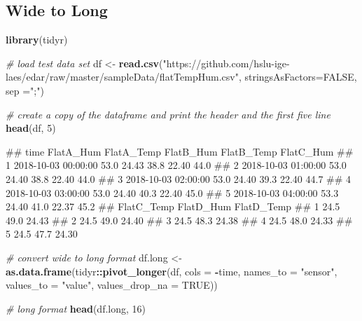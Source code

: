 \documentclass[
  a4paperpaper,
]{book}
\newenvironment{Shaded}{\begin{snugshade}}{\end{snugshade}}
\newcommand{\CommentTok}[1]{\textcolor[rgb]{0.56,0.35,0.01}{\textit{#1}}}
\newcommand{\DataTypeTok}[1]{\textcolor[rgb]{0.13,0.29,0.53}{#1}}
\newcommand{\DecValTok}[1]{\textcolor[rgb]{0.00,0.00,0.81}{#1}}
\newcommand{\KeywordTok}[1]{\textcolor[rgb]{0.13,0.29,0.53}{\textbf{#1}}}
\newcommand{\NormalTok}[1]{#1}
\newcommand{\OperatorTok}[1]{\textcolor[rgb]{0.81,0.36,0.00}{\textbf{#1}}}
\newcommand{\OtherTok}[1]{\textcolor[rgb]{0.56,0.35,0.01}{#1}}
\newcommand{\StringTok}[1]{\textcolor[rgb]{0.31,0.60,0.02}{#1}}
\let\oldShaded\Shaded
\let\endoldShaded\endShaded
\renewenvironment{Shaded}{\footnotesize\oldShaded}{\endoldShaded}
\let\oldverbatim\verbatim
\let\endoldverbatim\endverbatim
\renewenvironment{verbatim}{\footnotesize\oldverbatim}{\endoldverbatim}
\begin{document}
\newpage

\hypertarget{wide-to-long}{%
\subsection{Wide to Long}\label{wide-to-long}}

\begin{Shaded}
\begin{Highlighting}[]
\KeywordTok{library}\NormalTok{(tidyr)}

\CommentTok{# load test data set}
\NormalTok{df <-}\StringTok{ }\KeywordTok{read.csv}\NormalTok{(}\StringTok{"https://github.com/hslu-ige-laes/edar/raw/master/sampleData/flatTempHum.csv"}\NormalTok{,}
               \DataTypeTok{stringsAsFactors=}\OtherTok{FALSE}\NormalTok{,}
               \DataTypeTok{sep =}\StringTok{";"}\NormalTok{)}

\CommentTok{# create a copy of the dataframe and print the header and the first five line}
\KeywordTok{head}\NormalTok{(df, }\DecValTok{5}\NormalTok{)}
\end{Highlighting}
\end{Shaded}

\begin{verbatim}
##                  time FlatA_Hum FlatA_Temp FlatB_Hum FlatB_Temp FlatC_Hum
## 1 2018-10-03 00:00:00      53.0      24.43      38.8      22.40      44.0
## 2 2018-10-03 01:00:00      53.0      24.40      38.8      22.40      44.0
## 3 2018-10-03 02:00:00      53.0      24.40      39.3      22.40      44.7
## 4 2018-10-03 03:00:00      53.0      24.40      40.3      22.40      45.0
## 5 2018-10-03 04:00:00      53.3      24.40      41.0      22.37      45.2
##   FlatC_Temp FlatD_Hum FlatD_Temp
## 1       24.5      49.0      24.43
## 2       24.5      49.0      24.40
## 3       24.5      48.3      24.38
## 4       24.5      48.0      24.33
## 5       24.5      47.7      24.30
\end{verbatim}

\begin{Shaded}
\begin{Highlighting}[]
\CommentTok{# convert wide to long format}
\NormalTok{df.long <-}\StringTok{ }\KeywordTok{as.data.frame}\NormalTok{(tidyr}\OperatorTok{::}\KeywordTok{pivot_longer}\NormalTok{(df,}
                                             \DataTypeTok{cols =} \OperatorTok{-}\NormalTok{time,}
                                             \DataTypeTok{names_to =} \StringTok{"sensor"}\NormalTok{,}
                                             \DataTypeTok{values_to =} \StringTok{"value"}\NormalTok{,}
                                             \DataTypeTok{values_drop_na =} \OtherTok{TRUE}\NormalTok{))}

\CommentTok{# long format}
\KeywordTok{head}\NormalTok{(df.long, }\DecValTok{16}\NormalTok{)}
\end{Highlighting}
\end{Shaded}
\end{document}
